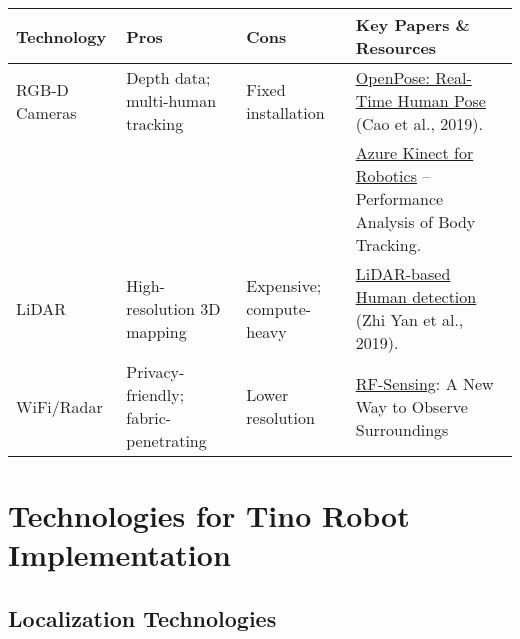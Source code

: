 \begin{table}[H]
    \centering
    \begin{tabular}{|>{\raggedright\arraybackslash}p{3cm}|>{\raggedright\arraybackslash}p{3cm}|>{\raggedright\arraybackslash}p{3cm}|>{\raggedright\arraybackslash}p{5cm}|}
        \hline
        \textbf{Technology} & \textbf{Pros} & \textbf{Cons} & \textbf{Key Papers \& Resources} \\ \hline
        RGB-D Cameras & Depth data; multi-human tracking & Fixed installation & \href{https://arxiv.org/abs/1812.08008}{OpenPose: Real-Time Human Pose} (Cao et al., 2019). \\ 
         & & & \href{https://ieeexplore.ieee.org/abstract/document/9480177}{Azure Kinect for Robotics} – Performance Analysis of Body Tracking. \\ \hline
        LiDAR & High-resolution 3D mapping & Expensive; compute-heavy & \href{https://link.springer.com/article/10.1007/s10514-019-09883-y}{LiDAR-based Human detection} (Zhi Yan et al., 2019). \\ \hline
        WiFi/Radar & Privacy-friendly; fabric-penetrating & Lower resolution & \href{https://ieeexplore.ieee.org/abstract/document/9982449}{RF-Sensing}: A New Way to Observe Surroundings\\ \hline
    \end{tabular}
\end{table}


\section*{Technologies for Tino Robot Implementation}

\subsection*{Localization Technologies}


